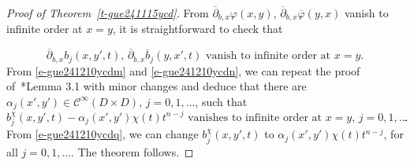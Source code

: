 \documentclass[12pt]{amsart}
\theoremstyle{definition}
\theoremstyle{named}
\numberwithin{equation}{subsection}
\newcommand{\ol}{\overline}
\newcommand{\ddbar}{\overline\partial}
\def\cC{\mathscr{C}}
\begin{document}
\begin{proof}[Proof of Theorem~\ref{t-gue241115ycd}]
From $\ddbar_{b,x}\varphi(x,y)$, $\ddbar_{b,x}\ol\varphi(y,x)$ vanish to infinite order at $x=y$, it is straightforward to check that  

\begin{equation}\label{e-gue241210ycdn}
\mbox{$\ddbar_{b,x}b_j(x,y',t)$, $\ddbar_{b,x}\ol b_j(y,x',t)$ vanish to infinite order at $x=y$}.
\end{equation}
From \eqref{e-gue241210ycdm} and \eqref{e-gue241210ycdn}, we can repeat the proof of~\cite{Hsiao_Galasso_JGA_2023}*{Lemma 3.1} with minor changes and deduce that there are $\alpha_j(x',y')\in\cC^\infty(D\times D)$, $j=0,1,\ldots$, such that 
\begin{equation}\label{e-gue241210ycdq}
\mbox{$b^\chi_j(x,y',t)-\alpha_j(x',y')\chi(t)t^{n-j}$ vanishes to infinite order at $x=y$, $j=0,1,\ldots$}.
\end{equation}
From \eqref{e-gue241210ycdq}, we can change $b^\chi_j(x,y',t)$ to $\alpha_j(x',y')\chi(t)t^{n-j}$, for all $j=0,1,\ldots$. The theorem follows. 
\end{proof}











	
 
 

 
\end{document}
